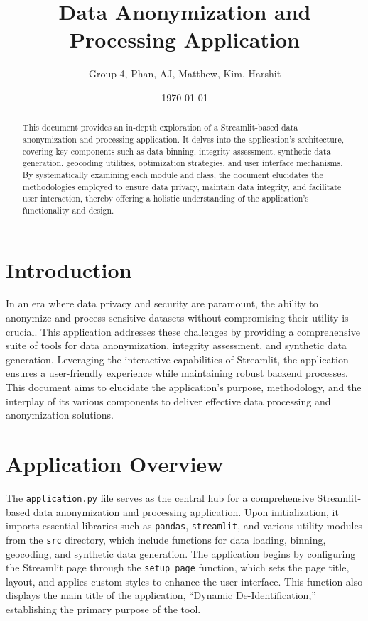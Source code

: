 \documentclass{article}
\title{Data Anonymization and Processing Application}
\author{Group 4, Phan, AJ, Matthew, Kim, Harshit}
\date{\today}
\begin{document}
\maketitle

\begin{abstract}
This document provides an in-depth exploration of a Streamlit-based data anonymization and processing application. It delves into the application's architecture, covering key components such as data binning, integrity assessment, synthetic data generation, geocoding utilities, optimization strategies, and user interface mechanisms. By systematically examining each module and class, the document elucidates the methodologies employed to ensure data privacy, maintain data integrity, and facilitate user interaction, thereby offering a holistic understanding of the application's functionality and design.
\end{abstract}

\section*{Introduction}
In an era where data privacy and security are paramount, the ability to anonymize and process sensitive datasets without compromising their utility is crucial. This application addresses these challenges by providing a comprehensive suite of tools for data anonymization, integrity assessment, and synthetic data generation. Leveraging the interactive capabilities of Streamlit, the application ensures a user-friendly experience while maintaining robust backend processes. This document aims to elucidate the application's purpose, methodology, and the interplay of its various components to deliver effective data processing and anonymization solutions.

\section*{Application Overview}
The \texttt{application.py} file serves as the central hub for a comprehensive Streamlit-based data anonymization and processing application. Upon initialization, it imports essential libraries such as \texttt{pandas}, \texttt{streamlit}, and various utility modules from the \texttt{src} directory, which include functions for data loading, binning, geocoding, and synthetic data generation. The application begins by configuring the Streamlit page through the \texttt{setup\_page} function, which sets the page title, layout, and applies custom styles to enhance the user interface. This function also displays the main title of the application, ``Dynamic De-Identification,'' establishing the primary purpose of the tool.
\end{document}
